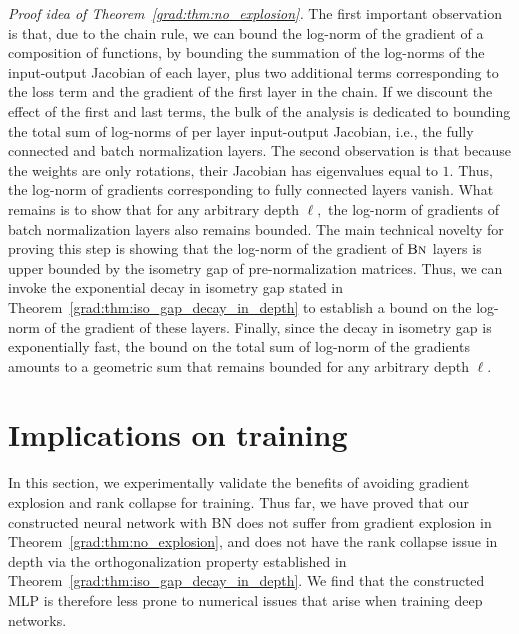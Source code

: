 \textit{Proof idea of Theorem~\ref{grad:thm:no_explosion}.}
    The first important observation is that, due to the chain rule, we can bound the log-norm of the gradient of a composition of functions, by bounding the summation of the log-norms of the input-output Jacobian of each layer, plus two additional terms corresponding to the loss term and the gradient of the first layer in the chain. If we discount the effect of the first and last terms, the bulk of the analysis is dedicated to bounding the total sum of log-norms of per layer input-output Jacobian, i.e., the fully connected and batch normalization layers. The second observation is that because the weights are only rotations, their Jacobian has eigenvalues equal to $1.$ Thus, the log-norm of gradients corresponding to fully connected layers vanish. What remains is to show that for any arbitrary depth $\ell,$ the log-norm of gradients of batch normalization layers also remains bounded. The main technical novelty for proving this step is showing that the log-norm of the gradient of $\text{\sc{Bn}}$ layers is upper bounded by the isometry gap of pre-normalization matrices. Thus, we can invoke the exponential decay in isometry gap stated in Theorem~\ref{grad:thm:iso_gap_decay_in_depth} to establish a bound on the log-norm of the gradient of these layers. Finally, since the decay in isometry gap is exponentially fast, the bound on the total sum of log-norm of the gradients amounts to a geometric sum that remains bounded for any arbitrary depth $\ell.$ 


    


\section{Implications on training}
\label{grad:sec:experiments}
In this section, we experimentally validate the benefits of avoiding gradient explosion and rank collapse for training.
Thus far, we have proved that our constructed neural network with BN does not suffer from gradient explosion in Theorem~\ref{grad:thm:no_explosion}, and does not have the rank collapse issue in depth via the orthogonalization property established in Theorem~\ref{grad:thm:iso_gap_decay_in_depth}. We find that the constructed MLP is therefore less prone to numerical issues that arise when training deep networks. %


